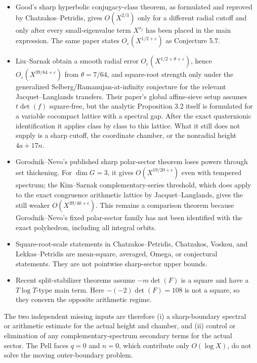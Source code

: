\begin{itemize}

\item
  Good's sharp hyperbolic conjugacy-class theorem, as formulated and reproved by Chatzakos--Petridis, gives \(O(X^{2/3})\) only for a different radial cutoff and only after every small-eigenvalue term \(X^{s_j}\) has been placed in the main expression. The same paper states \(O_\varepsilon(X^{1/2+\varepsilon})\) as Conjecture 5.7.
\item
  Liu--Sarnak obtain a smooth radial error \(O_\varepsilon(X^{1/2+\theta+\varepsilon})\), hence \(O_\varepsilon(X^{39/64+\varepsilon})\) from \(\theta=7/64\), and square-root strength only under the generalized Selberg/Ramanujan-at-infinity conjecture for the relevant Jacquet--Langlands transfers. Their paper's global affine-sieve setup assumes \(t\det(f)\) square-free, but the analytic Proposition 3.2 itself is formulated for a variable cocompact lattice with a spectral gap. After the exact quaternionic identification it applies class by class to this lattice. What it still does not supply is a sharp cutoff, the coordinate chamber, or the nonradial height \(4a+17n\).
\item
  Gorodnik--Nevo's published sharp polar-sector theorem loses powers through set thickening. For \(\dim G=3\), it gives \(O(X^{19/20+\epsilon})\) even with tempered spectrum; the Kim--Sarnak complementary-series threshold, which does apply to the exact congruence arithmetic lattice by Jacquet--Langlands, gives the still weaker \(O(X^{39/40+\epsilon})\). This remains a comparison theorem because Gorodnik--Nevo's fixed polar-sector family has not been identified with the exact polyhedron, including all integral orbits.
\item
  Square-root-scale statements in Chatzakos--Petridis, Chatzakos, Voskou, and Lekkas--Petridis are mean-square, averaged, Omega, or conjectural statements. They are not pointwise sharp-sector upper bounds.
\item
  Recent split-stabilizer theorems assume \(-m\det(F)\) is a square and have a \(T\log T\)-type main term. Here \(-(-2)\det(F)=108\) is not a square, so they concern the opposite arithmetic regime.
\end{itemize}

The two independent missing inputs are therefore (i) a sharp-boundary spectral or arithmetic estimate for the actual height and chamber, and (ii) control or elimination of any complementary-spectrum secondary terms for the actual sector. The Pell faces \(q=0\) and \(n=0\), which contribute only \(O(\log X)\), do not solve the moving outer-boundary problem.

